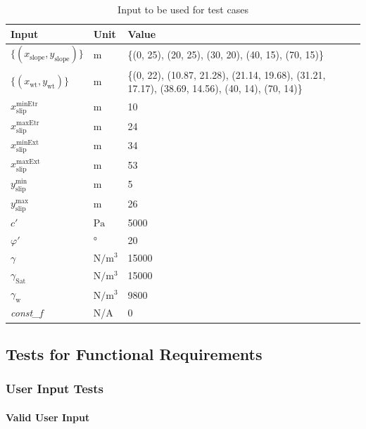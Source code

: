 \documentclass[12pt, titlepage]{article}
\begin{document}
\begin{table}[!h]
	\renewcommand{\arraystretch}{1.5}
	\begin{tabularx}{1.0\textwidth}{p{3cm} l X}
		\toprule \textbf{Input} &
		\textbf{Unit} & \textbf{Value}\\ \midrule
		$\{\left(x_\text{slope},y_\text{slope}\right)\}$ & $\text{m}$ & \{(0, 
		25), 
		(20, 25), (30, 20), (40, 15), (70, 15)\}\\
		$\{\left(x_\text{wt},y_\text{wt}\right)\}$ & $\text{m}$ & \{(0, 22), 
		(10.87, 21.28), (21.14, 19.68), (31.21, 17.17), (38.69, 14.56), (40, 
		14), (70, 14)\}\\
		${x_\text{slip}^\text{minEtr}}$ & $\text{m}$ & 10\\
		${x_\text{slip}^\text{maxEtr}}$ & $\text{m}$ & 24\\
		${x_\text{slip}^\text{minExt}}$ & $\text{m}$ & 34\\
		${x_\text{slip}^\text{maxExt}}$ & $\text{m}$ & 53\\
		${y_\text{slip}^\text{min}}$ & $\text{m}$ & 5\\
		${y_\text{slip}^\text{max}}$ & $\text{m}$ & 26\\
		$c'$ & $\si{\pascal}$ & 5000 \\
		$\varphi'$ & \si{\degree} & 20\\
		$\gamma$ & $\si{\newton\per\meter\cubed}$ & 15000 \\
		$\gamma_{\text{Sat}}$ & $\si{\newton\per\meter\cubed}$ & 15000 \\
		$\gamma_{\text{w}}$ & $\si{\newton\per\meter\cubed}$ & 9800 \\
		\textit{const\_f} & N/A & 0\\ 
		\bottomrule
	\end{tabularx}
	\caption{Input to be used for test cases}
	\label{ExValidInputs}
\end{table}
	
\subsection{Tests for Functional Requirements}

\subsubsection{User Input Tests}
		
\paragraph{Valid User Input}
\end{document}
